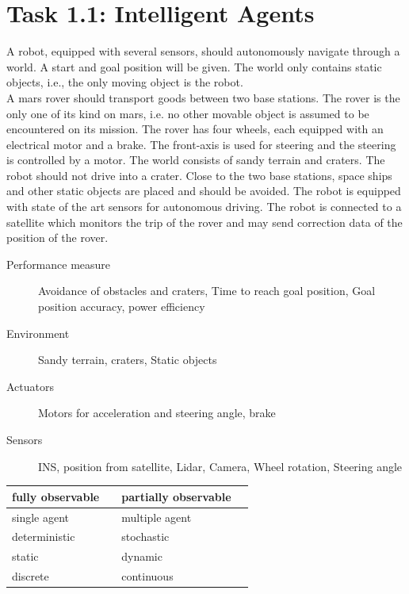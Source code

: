 \documentclass[a4paper,footsepline]{scrartcl}
\begin{document}
	\section*{Task 1.1: Intelligent Agents}
	A robot, equipped with several sensors, should autonomously navigate through a world. A
	start and goal position will be given. The world only contains static objects, i.e., the only
	moving object is the robot.\\
	A mars rover should transport goods between two base stations. The rover is the only one of its kind on mars, i.e. no other movable object is assumed to be encountered on its mission.  The rover has four wheels, each equipped with an electrical motor and a brake.
	The front-axis is used for steering and the steering is controlled by a motor. The world consists of sandy  terrain and craters. The robot should not drive into a crater. Close to the two base stations, space ships and other static objects are placed and should be avoided. The robot is equipped with state of the art sensors for autonomous driving. The robot is connected to a satellite which monitors the trip of the rover and may send correction data of the position of the rover.
	\begin{description}
		\item[Performance measure]
		Avoidance of obstacles and craters, Time to reach goal position, Goal position accuracy, power efficiency
		\item[Environment]
		Sandy terrain, craters, Static objects
		\item[Actuators]
		Motors for acceleration and steering angle, brake
		\item[Sensors]
		INS, position from satellite, Lidar, Camera, Wheel rotation, Steering angle
	\end{description}
	\vspace{0.3cm}
	\begin{tabular}{|lr|lr|}\hline
		fully observable & \Square & partially observable & \CheckedBox \\\hline
		single agent & \CheckedBox & multiple agent & \Square \\\hline
		deterministic & \Square & stochastic & \CheckedBox \\\hline
		static  & \CheckedBox & dynamic & \Square \\\hline
		discrete & \Square & continuous & \CheckedBox \\\hline
	\end{tabular}
\end{document}
